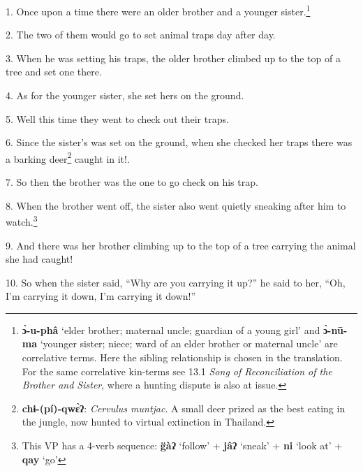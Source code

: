 \setcounter{footnote}{0}

1. Once upon a time there were an older brother and a younger sister.\footnote{\textbf{ɔ̀-u-phâ} `elder brother; maternal uncle; guardian of a young girl' and \textbf{ɔ̀-nū-ma} `younger sister; niece; ward of an elder brother or maternal uncle' are correlative terms. Here the sibling relationship is chosen in the translation. For the same correlative kin-terms see 13.1 \textit{Song of Reconciliation of the Brother and Sister}, where a hunting dispute is also at issue.}

2. The two of them would go to set animal traps day after day.

3. When he was setting his traps, the older brother climbed up to the top of a
tree and set one there.

4. As for the younger sister, she set hers on the ground.

5. Well this time they went to check out their traps.

6. Since the sister's was set on the ground, when she checked her traps there was
a barking deer\footnote{\textbf{chɨ-(pí)-qwɛ̀ʔ}: \textit{Cervulus muntjac}. A small deer prized as the best eating in the jungle, now hunted to virtual extinction in Thailand.} caught in it!.

7. So then the brother was the one to go check on his trap.

8. When the brother went off, the sister also went quietly sneaking after him to
watch.\footnote{This VP has a 4-verb sequence: \textbf{g̈àʔ} `follow' + \textbf{jâʔ} `sneak' + \textbf{ni} `look at' + \textbf{qay} `go'}

9. And there was her brother climbing up to the top of a tree carrying the animal
she had caught!

10. So when the sister said, ``Why are you carrying it up?'' he said to her, ``Oh,
I'm carrying it down, I'm carrying it down!''

